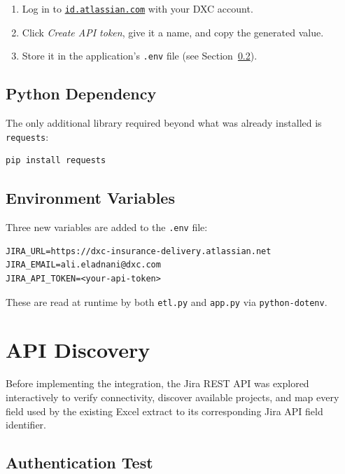 \documentclass[12pt, a4paper]{article}
\begin{document}
\begin{enumerate}
    \item Log in to \href{https://id.atlassian.com/manage-profile/security/api-tokens}
          {\texttt{id.atlassian.com}} with your DXC account.
    \item Click \textit{Create API token}, give it a name, and copy the generated value.
    \item Store it in the application's \texttt{.env} file (see Section~\ref{sec:env}).
\end{enumerate}

\subsection{Python Dependency}

The only additional library required beyond what was already installed is \texttt{requests}:

\begin{lstlisting}[style=bash]
pip install requests
\end{lstlisting}

\subsection{Environment Variables}
\label{sec:env}

Three new variables are added to the \texttt{.env} file:

\begin{lstlisting}[style=bash]
JIRA_URL=https://dxc-insurance-delivery.atlassian.net
JIRA_EMAIL=ali.eladnani@dxc.com
JIRA_API_TOKEN=<your-api-token>
\end{lstlisting}

These are read at runtime by both \texttt{etl.py} and \texttt{app.py} via \texttt{python-dotenv}.

\section{API Discovery}

Before implementing the integration, the Jira REST API was explored interactively to verify
connectivity, discover available projects, and map every field used by the existing Excel
extract to its corresponding Jira API field identifier.

\subsection{Authentication Test}
\end{document}
